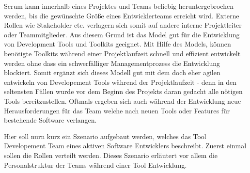 \documentclass[pagesize, paper=a4, fontsize=12pt, titlepage=true, headings=small, headnosepline, abstractoff, liststotoc, nochapterprefix, plainheadsepline, twoside]{scrreprt}
\begin{document}
Scrum kann innerhalb eines Projektes und Teams beliebig heruntergebrochen werden, bis die gewünschte Größe eines Entwicklerteams erreicht wird. Externe Rollen wie Stakeholder etc. verlagern sich somit auf andere interne Projektleiter oder Teammitglieder. Aus diesem Grund ist das Model gut für die Entwicklung von Development Tools und Toolkits geeignet. Mit Hilfe des Models, können benötigte Toolkits während einer Projektlaufzeit schnell und effizient entwickelt werden ohne dass ein schwerfälliger Managementprozess die Entwicklung blockiert. Somit ergänzt sich dieses Modell gut mit dem doch eher agilen entwickeln von Developement Tools während der Projektlaufzeit - denn in den seltensten Fällen wurde vor dem Beginn des Projekts daran gedacht alle nötigen Tools bereitzustellen. Oftmals ergeben sich auch während der Entwicklung neue Herausforderungen für das Team welche nach neuen Tools oder Features für bestehende Software verlangen.

Hier soll nurn kurz ein Szenario aufgebaut werden, welches das Tool Developement Team eines aktiven Software Entwicklers beschreibt. Zuerst einmal sollen die Rollen verteilt werden. Dieses Szenario erläutert vor allem die Personalstruktur der Teams während einer Tool Entwicklung.
\end{document}
